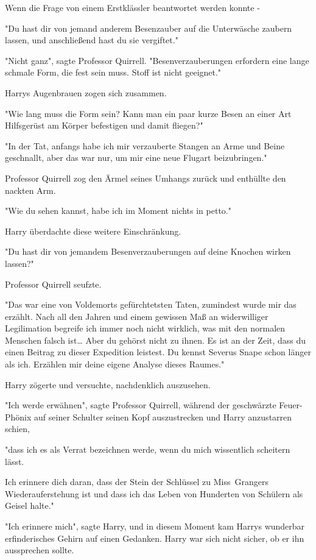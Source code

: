 {Wenn die Frage von einem Erstklässler beantwortet werden konnte -

"Du hast dir von jemand anderem Besenzauber auf die Unterwäsche zaubern lassen, und anschließend hast du sie vergiftet."

"Nicht ganz", sagte Professor Quirrell. "Besenverzauberungen erfordern eine lange schmale Form, die fest sein muss. Stoff ist nicht geeignet."

Harrys Augenbrauen zogen sich zusammen.

"Wie lang muss die Form sein? Kann man ein paar kurze Besen an einer Art Hilfsgerüst am Körper befestigen und damit fliegen?"

"In der Tat, anfangs habe ich mir verzauberte Stangen an Arme und Beine geschnallt, aber das war nur, um mir eine neue Flugart beizubringen."

Professor Quirrell zog den Ärmel seines Umhangs zurück und enthüllte den nackten Arm.

"Wie du sehen kannst, habe ich im Moment nichts in petto."

Harry überdachte diese weitere Einschränkung.

"Du hast dir von jemandem Besenverzauberungen auf deine Knochen wirken lassen?"

Professor Quirrell seufzte.

"Das war eine von Voldemorts gefürchtetsten Taten, zumindest wurde mir das erzählt. Nach all den Jahren und einem gewissen Maß an widerwilliger Legilimation begreife ich immer noch nicht wirklich, was mit den normalen Menschen falsch ist… Aber du gehörst nicht zu ihnen. Es ist an der Zeit, dass du einen Beitrag zu dieser Expedition leistest. Du kennst Severus Snape schon länger als ich. Erzählen mir deine eigene Analyse dieses Raumes."

Harry zögerte und versuchte, nachdenklich auszusehen.

"Ich werde erwähnen", sagte Professor Quirrell, während der geschwärzte Feuer-Phönix auf seiner Schulter seinen Kopf auszustrecken und Harry anzustarren schien,

"dass ich es als Verrat bezeichnen werde, wenn du mich wissentlich scheitern lässt.

Ich erinnere dich daran, dass der Stein der Schlüssel zu Miss~Grangers Wiederauferstehung ist und dass ich das Leben von Hunderten von Schülern als Geisel halte."

"Ich erinnere mich", sagte Harry, und in diesem Moment kam Harrys wunderbar erfinderisches Gehirn auf einen Gedanken. Harry war sich nicht sicher, ob er ihn aussprechen sollte.

}
